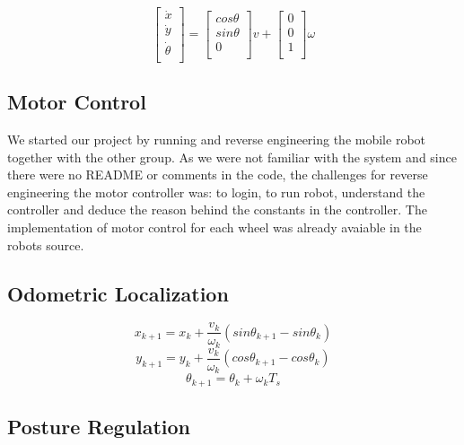 \documentclass[a4paper,10pt]{article}
\begin{document}
\begin{equation}
	\begin{bmatrix}
	\dot{x}\\ 
	\dot{y}\\
	\dot{\theta}\\  
	\end{bmatrix}
	=
	\begin{bmatrix}
	cos\theta\\ 
	sin\theta\\
	0\\  
	\end{bmatrix}v
	+
	\begin{bmatrix}
	0\\ 
	0\\
	1\\  
	\end{bmatrix}\omega
\end{equation}


\subsection{Motor Control}
	We started our project by running and reverse engineering the mobile robot together with the other group.
	As we were not familiar with the system and since there were no README or comments in the code, the challenges for 		reverse engineering the motor controller was: 
	to login, to run robot, understand the controller and deduce the reason behind the constants in the controller.
	The implementation of motor control for each wheel was already avaiable in the robots source. 

\subsection{Odometric Localization}
		
		\begin{equation}
		x_{k+1}=x_k+\frac{v_k}{\omega_k}(sin\theta_{k+1}-sin\theta_k)
		\end{equation}
		\begin{equation}
		y_{k+1}=y_k+\frac{v_k}{\omega_k}(cos\theta_{k+1}-cos\theta_k)
		\end{equation}
		\begin{equation}
		\theta_{k+1}=\theta_k+\omega_kT_s
		\end{equation}
		
\subsection{Posture Regulation}
\end{document}
